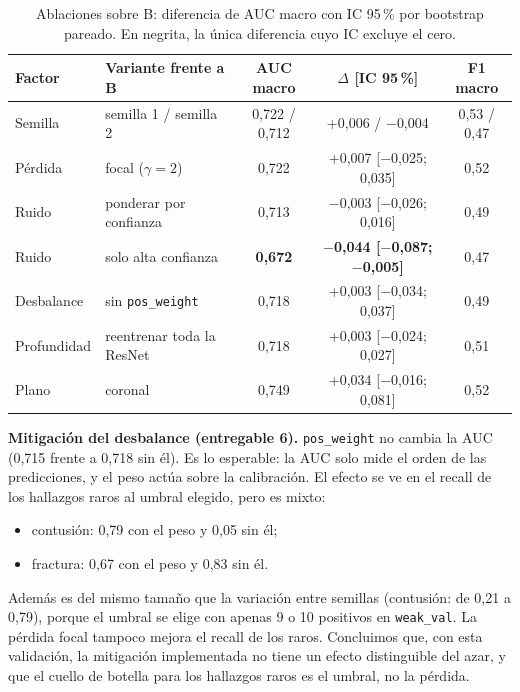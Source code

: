 \begin{table}[t]
  \caption{Ablaciones sobre B: diferencia de AUC macro con IC 95\,\% por bootstrap pareado.
    En negrita, la única diferencia cuyo IC excluye el cero.}
  \label{tab:ablacion}
  \centering
  \small
  \begin{tabular}{llccc}
    \toprule
    Factor & Variante frente a B & AUC macro & $\Delta$ [IC 95\,\%] & F1 macro \\
    \midrule
    Semilla       & semilla 1 / semilla 2 & 0,722 / 0,712 & +0,006 / $-$0,004 & 0,53 / 0,47 \\
    Pérdida       & focal ($\gamma=2$) & 0,722 & +0,007 [$-$0,025; 0,035] & 0,52 \\
    Ruido         & ponderar por confianza & 0,713 & $-$0,003 [$-$0,026; 0,016] & 0,49 \\
    Ruido         & solo alta confianza & \textbf{0,672} & \textbf{$-$0,044 [$-$0,087; $-$0,005]} & 0,47 \\
    Desbalance    & sin \texttt{pos\_weight} & 0,718 & +0,003 [$-$0,034; 0,037] & 0,49 \\
    Profundidad   & reentrenar toda la ResNet & 0,718 & +0,003 [$-$0,024; 0,027] & 0,51 \\
    Plano         & coronal & 0,749 & +0,034 [$-$0,016; 0,081] & 0,52 \\
    \bottomrule
  \end{tabular}
\end{table}

\textbf{Mitigación del desbalance (entregable 6).} \texttt{pos\_weight} no cambia la AUC
(0,715 frente a 0,718 sin él). Es lo esperable: la AUC solo mide el orden de las predicciones,
y el peso actúa sobre la calibración. El efecto se ve en el recall de los hallazgos raros al
umbral elegido, pero es mixto:
\begin{itemize}
  \item contusión: 0,79 con el peso y 0,05 sin él;
  \item fractura: 0,67 con el peso y 0,83 sin él.
\end{itemize}
Además es del mismo tamaño que la variación entre semillas (contusión: de 0,21 a 0,79),
porque el umbral se elige con apenas 9 o 10 positivos en \texttt{weak\_val}. La pérdida focal
tampoco mejora el recall de los raros. Concluimos que, con esta validación, la mitigación
implementada no tiene un efecto distinguible del azar, y que el cuello de botella para los
hallazgos raros es el umbral, no la pérdida.

